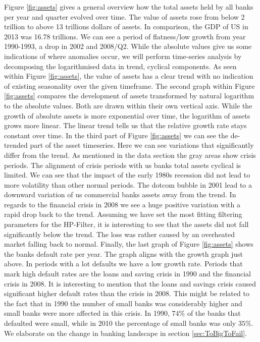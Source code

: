 \documentclass[12pt, a4paper]{article} %
\begin{document}
 
 Figure \ref{fig:assets} gives a general overview how the total assets held by all banks per year and quarter evolved over time. The value of assets rose from below 2 trillion to above 13 trillions dollars of assets. In comparison, the GDP of US in 2013 was 16.78 trillions. We can see a period of flatness/low growth from  year 1990-1993, a drop in 2002 and 2008/Q2. While the absolute values give us some indications of where anomalies occur, we will perform time-series analysis by decomposing the logarithmised data in trend, cyclical components. As seen within Figure \ref{fig:assets}, the value of assets has a clear trend with no indication of existing seasonality over the given timeframe. The second graph within Figure \ref{fig:assets} compares the development of assets transformed by natural logarithm to the absolute values. Both are drawn within their own vertical axis. While the growth of absolute assets is more exponential over time, the logarithm of assets grows more linear. The linear trend tells us that the relative growth rate stays constant over time. In the third part of Figure \ref{fig:assets} we can see the de-trended part of the asset timeseries. Here we can see variations that significantly differ from the trend. As mentioned in the data section the gray areas show crisis periods. The alignment of crisis periods with us banks total assets cyclical is limited. We can see that the impact of the early 1980s recession did not lead to more volatility than other normal periods. The dotcom bubble in 2001 lead to a downward variation of us commercial banks assets away from the trend. In regards to the financial crisis in 2008 we see a huge positive variation with a rapid drop back to the trend. Assuming we have set the most fitting filtering parameters for the HP-Filter, it is interesting to see that the assets did not fall significantly below the trend. The loss was rather caused by an overheated market falling back to normal. Finally, the last graph of Figure \ref{fig:assets} shows the banks default rate per year. The graph aligns with the growth graph just above. In periods with a lot defaults we have a low growth rate. Periods that mark high default rates are the loans and saving crisis in 1990 and the financial crisis in 2008. It is interesting to mention that the loans and savings crisis caused significant higher default rates than the crisis in 2008. This might be related to the fact that in 1990 the number of small banks was considerably higher and small banks were more affected in this crisis. In 1990, $74\%$ of the banks that defaulted were small, while in 2010 the percentage of small banks was only $35\%$. We elaborate on the change in banking landscape in section \ref{sec:ToBigToFail}.
 
\end{document}
